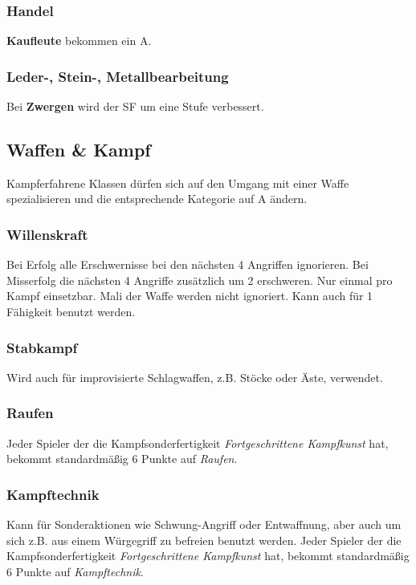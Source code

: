 \subsubsection{Handel}
\textbf{Kaufleute} bekommen ein A.

\subsubsection{Leder-, Stein-, Metallbearbeitung}
Bei \textbf{Zwergen} wird der SF um eine Stufe verbessert. 

\subsection{Waffen \& Kampf}
\label{chap:waffen_und_kampf}
Kampferfahrene Klassen dürfen sich auf den Umgang mit einer Waffe spezialisieren und die entsprechende Kategorie auf A ändern.

\subsubsection{Willenskraft}
Bei Erfolg alle Erschwernisse bei den nächsten 4 Angriffen ignorieren. Bei Misserfolg die nächsten 4 Angriffe zusätzlich um 2 erschweren. Nur einmal pro Kampf einsetzbar. Mali der Waffe werden nicht ignoriert. Kann auch für 1 Fähigkeit benutzt werden.

\subsubsection{Stabkampf}
Wird auch für improvisierte Schlagwaffen, z.B. Stöcke oder Äste, verwendet.

\subsubsection{Raufen}
Jeder Spieler der die Kampfsonderfertigkeit \textit{Fortgeschrittene Kampfkunst} hat, bekommt standardmäßig 6 Punkte auf \textit{Raufen}.

\subsubsection{Kampftechnik}
Kann für Sonderaktionen wie Schwung-Angriff oder Entwaffnung, aber auch um sich z.B. aus einem Würgegriff zu befreien benutzt werden. Jeder Spieler der die Kampfsonderfertigkeit \textit{Fortgeschrittene Kampfkunst} hat, bekommt standardmäßig 6 Punkte auf \textit{Kampftechnik}.


